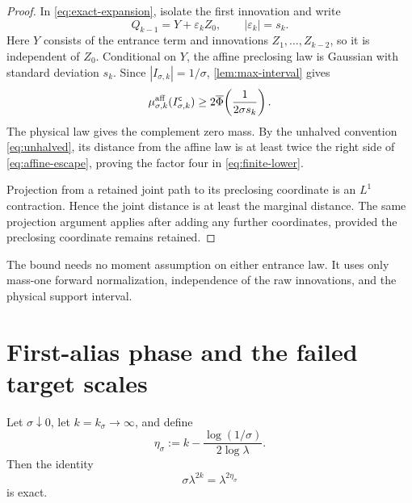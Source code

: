 \documentclass[11pt]{article}
\theoremstyle{definition}
\theoremstyle{remark}
\newcommand{\Phibar}{\overline\Phi}
\begin{document}
\begin{proof}
In \eqref{eq:exact-expansion}, isolate the first innovation and write
\begin{equation}\label{eq:Y-plus-noise}
 Q_{k-1}=Y+\varepsilon_kZ_0,
 \qquad |\varepsilon_k|=s_k.
\end{equation}
Here $Y$ consists of the entrance term and innovations $Z_1,\ldots,Z_{k-2}$,
so it is independent of $Z_0$.  Conditional on $Y$, the affine preclosing
law is Gaussian with standard deviation $s_k$.  Since
$|I_{\sigma,k}|=1/\sigma$, \cref{lem:max-interval} gives
\begin{equation}\label{eq:affine-escape}
 \mu^{\rm aff}_{\sigma,k}(I_{\sigma,k}^{\mathsf c})
 \ge2\Phibar\!\left(\frac1{2\sigma s_k}\right).
\end{equation}
The physical law gives the complement zero mass.  By the unhalved convention
\eqref{eq:unhalved}, its distance from the affine law is at least twice the
right side of \eqref{eq:affine-escape}, proving the factor four in
\eqref{eq:finite-lower}.

Projection from a retained joint path to its preclosing coordinate is an
$L^1$ contraction.  Hence the joint distance is at least the marginal
distance.  The same projection argument applies after adding any further
coordinates, provided the preclosing coordinate remains retained.
\end{proof}

The bound needs no moment assumption on either entrance law.  It uses only
mass-one forward normalization, independence of the raw innovations, and
the physical support interval.

\section{First-alias phase and the failed target scales}

Let $\sigma\downarrow0$, let $k=k_\sigma\to\infty$, and define
\begin{equation}\label{eq:phase-clock}
 \eta_\sigma
 :=k-\frac{\log(1/\sigma)}{2\log\lambda}.
\end{equation}
Then the identity
\begin{equation}\label{eq:clock-identity}
 \sigma\lambda^{2k}=\lambda^{2\eta_\sigma}
\end{equation}
is exact.
\end{document}
